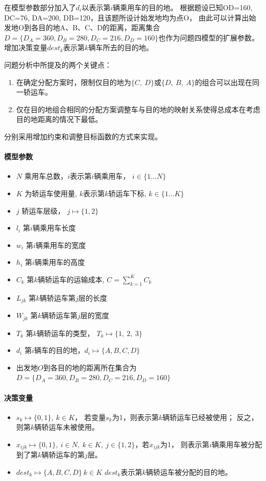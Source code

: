 \documentclass[UTF8，12pt]{ctexart}
\begin{document}
	在模型参数部分加入了$d_i$以表示第$i$辆乘用车的目的地。
	根据题设已知OD=160, DC=76, DA=200, DB=120，且该题所设计始发地均为点O，
	由此可以计算出始发地O到各目的地A、B、C、D的距离，距离集合
	$D=\{D_A=360, D_B=280, D_C=216, D_D=160\}$也作为问题四模型的扩展参数。\\
	
	增加决策变量$dest_k$表示第$k$辆车所去的目的地。
	
	问题分析中所提及的两个关键点：
	\begin{enumerate}
		\item 在确定分配方案时，限制仅目的地为$\{C,~D\}$或$\{D,~B,~A\}$的组合可以出现在同一轿运车。
		\item 仅在目的地组合相同的分配方案调整车与目的地的映射关系使得总成本在考虑目的地距离的情况下最低。
	\end{enumerate}
	分别采用增加约束和调整目标函数的方式来实现。
	
	
	
\paragraph{模型参数}
	\begin{itemize}
			\item $N$ 乘用车总数，$i$表示第$i$辆乘用车， $i \in \{1 \dots N\}$
			\item $K$ 为轿运车使用量, $k$表示第$k$轿运车下标,  $k \in \{1 \dots K\}$
			\item $j$ 轿运车层级， $j \mapsto \{1,2\}$
			\item $l_i$ 第$i$辆乘用车长度
			\item $w_i$ 第$i$辆乘用车的宽度
			\item $h_i$ 第$i$辆乘用车的高度
			\item $C_k$ 第$k$辆轿运车的运输成本, $C=\sum_{k=1}^{K}C_k$
			\item $L_{jk}$ 第$k$辆轿运车第$j$层的长度
			\item $W_{jk}$ 第$k$辆轿运车第$j$层的宽度
			\item $T_k$ 第$k$辆轿运车的类型， $T_k \mapsto \{1, ~2, ~3\}$
			\item $d_i$ 第$i$辆车的目的地，$d_i \mapsto \{A, B, C, D\}$		
			\item 出发地$O$到各目的地的距离所在集合为 $D=\{D_A=360, D_B=280, D_C=216, D_D=160\}$
		\end{itemize}
\paragraph{决策变量}
	\begin{itemize}
		\item $s_k \mapsto \{0,1\}, ~ k \in K$， 若变量$s_k$为1，则表示第$k$辆轿运车已经被使用；
		反之，则第$k$辆轿运车未被使用。
		\item $x_{ijk}\mapsto \{0,1\}, ~ i\in N,~ k \in K,~ j\in \{1,2\}$，若$x_{ijk}$为1，
		则表示第$i$辆乘用车被分配到了第$k$辆轿运车的第$j$层。
		\item $dest_k \mapsto \{A,B,C,D\}  ~ k \in K$ $dest_k$表示第$k$辆轿运车被分配的目的地。
	\end{itemize}
\end{document}
